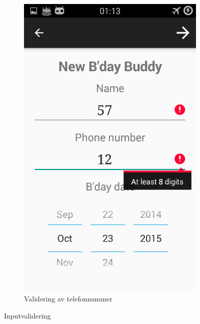 \begin{figure}[ht]
    \begin{subfigure}[b]{0.35\textwidth}
        \includegraphics[width=\textwidth]{./img/16.png}
        \caption{Validering av telefonnummer}
        \label{fig:validering_tall}
    \end{subfigure}
    \caption{Inputvalidering}
    \label{fig:validering}
\end{figure}

